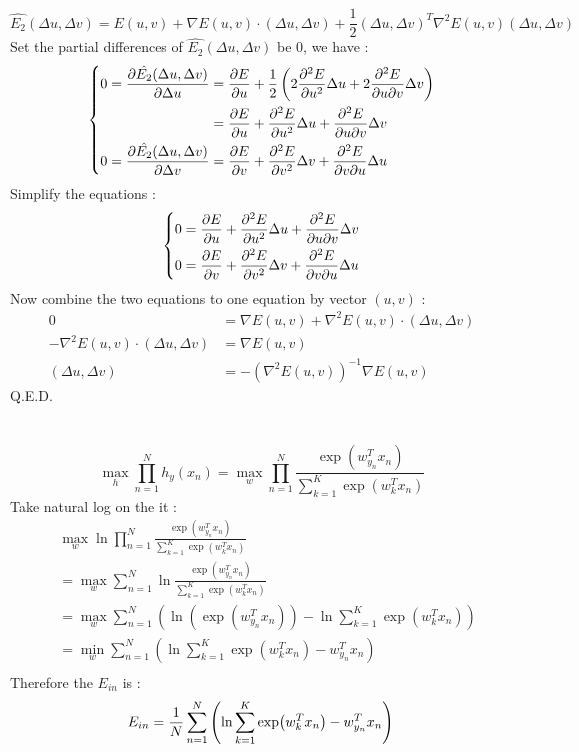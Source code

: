 \documentclass[12pt,a4paper]{article}
\begin{document}
\section{} %
\[
	\hat{{E}_2}(\Delta u,\Delta v)
		= E(u, v) + \nabla E(u, v) \cdot (\Delta u, \Delta v)
		+ \frac{1}{2} {(\Delta u, \Delta v)}^{T} {\nabla}^{2}E(u, v) (\Delta u, \Delta v)
\]
Set the partial differences of $\hat{{E}_2}(\Delta u,\Delta v)$ be $0$, we have :
\[
	\left\{
		\begin{aligned}
			0 = \pdv{\hat{{E}_2}(\Delta u,\Delta v)}{\Delta u}
				&= \pdv{E}{u} + \frac{1}{2}\left( 2 \pdv[2]{E}{u} \Delta u + 2 \pdv{E}{u}{v} \Delta v \right) \\
				&= \pdv{E}{u} + \pdv[2]{E}{u} \Delta u + \pdv{E}{u}{v} \Delta v \\
			0 = \pdv{\hat{{E}_2}(\Delta u,\Delta v)}{\Delta v}
				&= \pdv{E}{v} + \pdv[2]{E}{v} \Delta v + \pdv{E}{v}{u} \Delta u \\
		\end{aligned}
	\right.
\]
Simplify the equations :
\[
	\left\{
		\begin{aligned}
			0 &= \pdv{E}{u} + \pdv[2]{E}{u} \Delta u + \pdv{E}{u}{v} \Delta v \\
			0 &= \pdv{E}{v} + \pdv[2]{E}{v} \Delta v + \pdv{E}{v}{u} \Delta u \\
		\end{aligned}
	\right.
\]
Now combine the two equations to one equation by vector $(u, v)$ :
\[
	\begin{aligned}
		0 &= \nabla E(u, v) + {\nabla}^{2} E(u, v) \cdot (\Delta u, \Delta v) \\
		- {\nabla}^{2} E(u, v) \cdot (\Delta u, \Delta v) &= \nabla E(u, v) \\
		(\Delta u, \Delta v) &= - {\left({\nabla}^{2} E(u, v)\right)}^{-1} \nabla E(u, v)
	\end{aligned}
\]
Q.E.D.
\section{} %
\[
		\max_{h} \prod_{n=1}^{N} h_{y}\left(x_{n}\right) 
		= \max_{w} \prod_{n=1}^{N}
			\frac{\exp({w}_{y_{n}}^{T}x_{n})}{\sum_{k=1}^{K} \exp({w}_{k}^{T}x_{n})}
\]
Take natural log on the it :
\[
	\begin{aligned}
		& \max_{w} \ln \prod_{n=1}^{N}
			\frac{\exp({w}_{y_{n}}^{T}x_{n})}{\sum_{k=1}^{K} \exp({w}_{k}^{T}x_{n})} \\
		&= \max_{w} \sum_{n=1}^{N} \ln
			\frac{\exp({w}_{y_{n}}^{T}x_{n})}{\sum_{k=1}^{K} \exp({w}_{k}^{T}x_{n})} \\
		&= \max_{w} \sum_{n=1}^{N} \left( \ln( \exp({w}_{y_{n}}^{T}x_{n}) ) -
			\ln\sum_{k=1}^{K} \exp({w}_{k}^{T}x_{n}) \right) \\
		&= \min_{w} \sum_{n=1}^{N} \left( \ln\sum_{k=1}^{K} \exp({w}_{k}^{T}x_{n}) -
			{w}_{y_{n}}^{T}x_{n} \right) \\
	\end{aligned}
\]
Therefore the $E_{in}$ is :
\[
	E_{in} = \frac{1}{N} \sum_{n=1}^{N} \left( \ln \sum_{k=1}^{K} \exp({w}_{k}^{T}x_{n}) -
		{w}_{y_{n}}^{T}x_{n} \right) \\
\]
\end{document}
